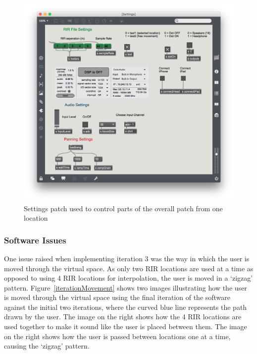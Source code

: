 \documentclass[../../main.tex]{subfiles}
\begin{document}
		\begin{figure}[H]
			\centerline{\includegraphics[scale = 0.4]{Sections/Implementation/Max/images/settings.png}}
			\caption{Settings patch used to control parts of the overall patch from one location}
			\label{settings}
		\end{figure}

		\subsubsection{Software Issues}
	\label{iteration3Issues}

		One issue raised when implementing iteration 3 was the way in which the user is moved through the virtual space. As only two \ac{RIR} locations are used at a time as opposed to using 4 \ac{RIR} locations for interpolation, the user is moved in a `zigzag' pattern. Figure~\ref{iterationMovement} shows two images illustrating how the user is moved through the virtual space using the final iteration of the software against the initial two iterations, where the curved blue line represents the path drawn by the user. The image on the right shows how the 4 \ac{RIR} locations are used together to make it sound like the user is placed between them. The image on the right shows how the user is passed between locations one at a time, causing the `zigzag' pattern.
\end{document}
